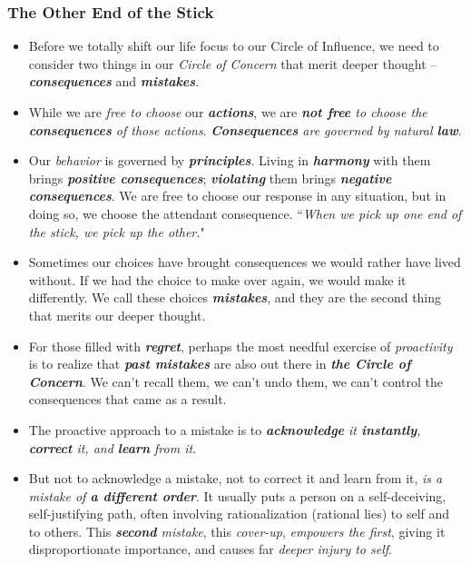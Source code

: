 \documentclass[11pt]{article}
\begin{document}
\subsubsection{The Other End of the Stick}
\begin{itemize}
\item Before we totally shift our life focus to our Circle of Influence, we need to consider two things in our \emph{Circle of Concern} that merit deeper thought -- \emph{\textbf{consequences}} and \emph{\textbf{mistakes}}.

\item While we are \emph{free to choose} our \emph{\textbf{actions}}, we are \emph{\textbf{not free} to choose the \textbf{consequences} of those actions}. \emph{\textbf{Consequences} are governed by natural \textbf{law}}. 

\item Our \emph{behavior} is governed by \emph{\textbf{principles}}. Living in \emph{\textbf{harmony}} with them brings \emph{\textbf{positive consequences}}; \emph{\textbf{violating}} them brings \emph{\textbf{negative consequences}}. We are free to choose our response in any situation, but in doing so, we choose the attendant consequence. ``\emph{When we pick up one end of the stick, we pick up the other.}"

\item Sometimes our choices have brought consequences we would rather have lived without. If we had the choice to make over again, we would make it differently. We call these choices \emph{\textbf{mistakes}}, and they are the second thing that merits our deeper thought.

\item For those filled with \emph{\textbf{regret}}, perhaps the most needful exercise of \emph{proactivity} is to realize that \emph{\textbf{past mistakes}} are also out there in \emph{\textbf{the Circle of Concern}}. We can't recall them, we can't undo them, we can't control the consequences that came as a result.

\item The proactive approach to a mistake is to \emph{\textbf{acknowledge} it \textbf{instantly}, \textbf{correct} it, and \textbf{learn} from it}.

\item But not to acknowledge a mistake, not to correct it and learn from it, \emph{is a mistake of \textbf{a different order}}. It usually puts a person on a self-deceiving, self-justifying path, often involving rationalization (rational lies) to self and to others. This \emph{\textbf{second} mistake}, this \emph{cover-up}, \emph{empowers the first}, giving it disproportionate importance, and causes far \emph{deeper injury to self}.
\end{itemize}
\end{document}
